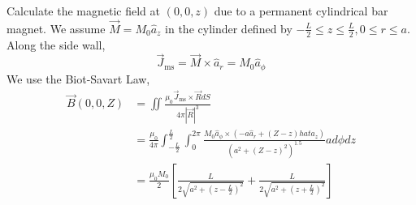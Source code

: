 \documentclass[12pt]{article}
\begin{document}
\begin{ex}
	Calculate the magnetic field at $(0,0,z)$ due to a permanent cylindrical bar magnet. We assume $\vec M = M_0\hat a_z$ in the cylinder defined by $-\frac{L}{2} \leq z \leq \frac{L}{2}, 0 \leq r \leq a$. \\
	Along the side wall,
	$$\vec{J}_{\text{ms}} = \vec M \times \hat a_r = M_0\hat a_\phi$$
	We use the Biot-Savart Law,
	\begin{align*}
		\vec B(0,0,Z) &= \iint \frac{\mu_0\vec{J}_{\text{ms}} \times \vec R dS}{4\pi|\vec R|^3} \\
			      &= \frac{\mu_0}{4\pi} \int_{-\frac{L}{2}}^{\frac{L}{2}} \int_0^{2\pi} \frac{M_0\hat a_\phi \times (-a\hat a_r + (Z-z)hat a_z)}{\left(a^2+(Z-z)^2\right)^{1.5}} ad\phi dz \\
			      &= \frac{\mu_0M_0}{2} \left[\frac{L}{2\sqrt{a^2+\left(z-\frac{L}{2}\right)^2}} + \frac{L}{2\sqrt{a^2+\left(z+\frac{L}{2}\right)^2}}\right]
	\end{align*}
\end{ex}
\end{document}

